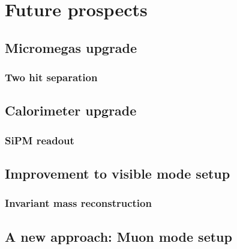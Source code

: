 
\chapter{Future prospects} %

\label{chapter5} %


\section{Micromegas upgrade}

\subsection{Two hit separation}

\section{Calorimeter upgrade}

\subsection{SiPM readout}

\section{Improvement to visible mode setup}

\subsection{Invariant mass reconstruction}

\section{A new approach: Muon mode setup}
